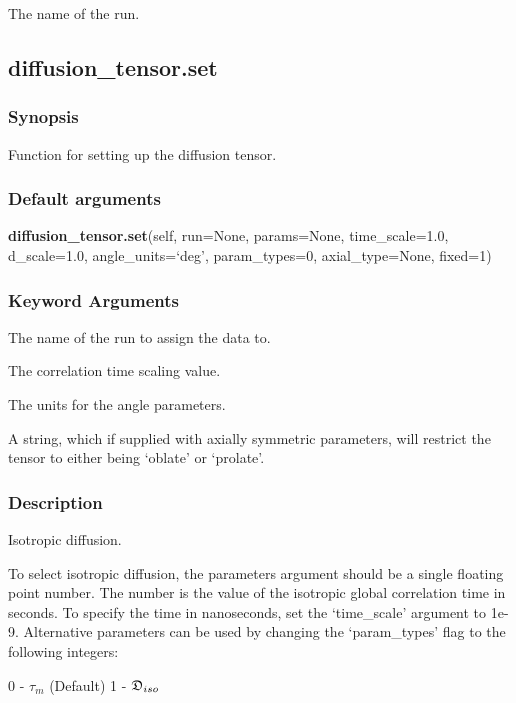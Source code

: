   The name of the run.


\newpage

\subsection{diffusion\_tensor.set}


\subsubsection{Synopsis}

Function for setting up the diffusion tensor.

\subsubsection{Default arguments}

\textsf{\textbf{diffusion\_tensor.set}(self, run=None, params=None, time\_scale=1.0, d\_scale=1.0, angle\_units=`deg', param\_types=0, axial\_type=None, fixed=1)}


\subsubsection{Keyword Arguments}

  The name of the run to assign the data to.

  The correlation time scaling value.

  The units for the angle parameters.

  A string, which if supplied with axially symmetric parameters, will restrict the tensor to either being `oblate' or `prolate'.


\subsubsection{Description}

Isotropic diffusion.

To select isotropic diffusion, the parameters argument should be a single floating point
number.  The number is the value of the isotropic global correlation time in seconds.  To
specify the time in nanoseconds, set the `time\_scale' argument to 1e-9.  Alternative
parameters can be used by changing the `param\_types' flag to the following integers:

    0 - $\tau_m$   (Default)
    1 - $\mathfrak{D}_{iso}$

